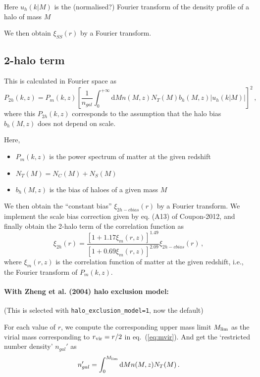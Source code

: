 \documentclass[10pt,a4paper]{article}
\begin{document}
Here $u_h(k|M)$ is the (normalised?) Fourier transform of the density profile of a halo of mass $M$

We then obtain $\xi_{SS}(r)$ by a Fourier transform.

\subsection{2-halo term}

This is calculated in Fourier space as
\begin{equation}
\label{eq:P2h}
P_{2h}(k,z) = P_m(k,z)\left[ \frac{1}{n_{gal}} \int_0^{+\infty} \mathrm{d}M n(M,z) N_T(M) b_h(M,z) \left| u_h(k|M)\right| \right]^2 \, ,
\end{equation}
where this $P_{2h}(k,z)$ corresponds to the assumption that the halo bias $b_h(M,z)$ does not depend on scale.

Here,
\begin{itemize}
\item $P_m(k,z)$ is the power spectrum of matter at the given redshift
\item $N_T(M) = N_C(M) + N_S(M)$
\item $b_h(M,z)$ is the bias of haloes of a given mass $M$
\end{itemize}

We then obtain the ``constant bias'' $\xi_{2h-cbias}(r)$ by a Fourier transform. 
We implement the scale bias correction given by eq. (A13) of Coupon-2012, and finally obtain the 2-halo term of the correlation function as
\begin{equation}
  \label{eq:1}
  \xi_{2h}(r) = \frac{\left[ 1 + 1.17 \xi_m(r,z)\right]^{1.49}}{\left[ 1 + 0.69 \xi_m(r,z)\right]^{2.09}} \xi_{2h-cbias}(r) \, , 
\end{equation}
where $\xi_m(r,z)$ is the correlation function of matter at the given redshift, i.e., the Fourier transform of $P_m(k,z)$.


\paragraph{With Zheng et al. (2004) halo exclusion model:}

(This is selected with \texttt{halo\_exclusion\_model=1}, now the default)

For each value of $r$, we compute the corresponding upper mass limit $M_{\rm lim}$ as the virial mass corresponding to $r_{\rm vir} = r/2$ in eq.~(\ref{eq:mvir}). And get the `restricted number density' $n_{gal}'$ as
\begin{equation}
  \label{eq:2}
  n_{gal}' = \int_0^{M_{\rm lim}} \mathrm{d}M n(M,z) N_T(M) \, .
\end{equation}
\end{document}
